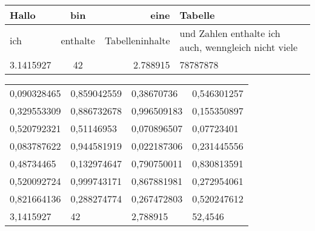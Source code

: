\documentclass[ngerman,10pt,parskip=half]{scrartcl}
\begin{document}
\listoftables

\clearpage

\begin{tabular}{|l|c|r|p{5cm}|} \hline
Hallo & bin & eine  & Tabelle \\	\hline
ich 	& enthalte & Tabelleninhalte & und Zahlen enthalte ich auch, wenngleich nicht viele  \\ \hline
3.1415927 & 42 & 2.788915 & 78787878 \\ \hline
\end{tabular}

\vspace*{3cm}

\begin{tabular}{llll} \toprule[1.5pt]
0,090328465	&	0,859042559	&	0,38670736	&	0,546301257	\\
0,329553309	&	0,886732678	&	0,996509183	&	0,155350897	\\
0,520792321	&	0,51146953	&	0,070896507	&	0,07723401	\\
0,083787622	&	0,944581919	&	0,022187306	&	0,231445556	\\
0,48734465	&	0,132974647	&	0,790750011	&	0,830813591	\\
0,520092724	&	0,999743171	&	0,867881981	&	0,272954061	\\
0,821664136	&	0,288274774	&	0,267472803	&	0,520247612	\\
3,1415927 & 42 & 2,788915 & 52,4546 \\ \bottomrule[1.5pt]
\end{tabular}

\vspace*{3cm}
\end{document}
